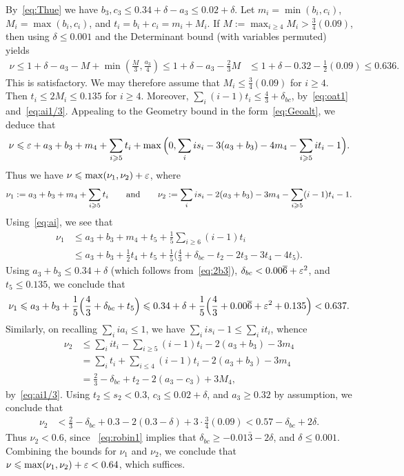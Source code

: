 By~\eqref{eq:Thue} we have $b_3,c_3\le 0.34+\delta-a_3\le 0.02+\delta$.
Let $m_i=\min(b_i,c_i)$, $M_i=\max(b_i,c_i)$, and $t_i=b_i+c_i=m_i+M_i$.
 If $M :=\max_{i\ge4}M_i > \frac{3}{4}(0.09)$, then using $\delta\leq 0.001$ and the Determinant bound (with variables permuted) yields
\begin{align*}
\nu \le 1 +\delta- a_3 - M + \min\left(\frac{M}{3}, \frac{a_3}{4}\right)
\le 1+\delta - a_3 - \frac{2}{3}M
&\le 1+\delta-0.32 - \frac{1}{2}(0.09) \le 0.636.
\end{align*}
This is satisfactory.
We may therefore assume that $M_i\le \frac{3}{4}(0.09)$ for $i\ge4$. Then $t_i\le 2M_i\le 0.135$ for $i\ge4$.
Moreover, $\sum_{i}(i-1)t_i \le \frac{4}{3}+\delta_{bc}$, by~\eqref{eq:oat1}
 and~\eqref{eq:ai1/3}.
Appealing to the Geometry bound in the form~\eqref{eq:Geoalt}, we deduce that
\begin{align*}
\nu \le \eps + a_3+b_3 + m_4+\sum_{i\ge5}t_i + \max\Big(0 , \sum_i is_i - 3(a_3+b_3) - 4m_4-\sum_{i\ge5}it_i - 1\Big).
\end{align*}
Thus we have $\nu \le \max(\nu_1,\nu_2)+\eps$, where
\begin{align*}
\nu_1 := a_3+b_3 + m_4+\sum_{i\ge5}t_i
\qquad{\rm and}\qquad
\nu_2
:= \sum_i is_i -2(a_3+b_3) - 3m_4 - \sum_{i\ge5}(i-1)t_i -1.
\end{align*}
Using~\eqref{eq:ai}, we see that
\begin{align*}
\nu_1 &\le a_3+b_3 +m_4+t_5+\frac{1}{5}\sum_{i\ge6}(i-1)t_i\\
 & \le a_3 + b_3 + \frac{1}{2}t_4+t_5+\frac{1}{5}\Big(\frac{4}{3}+\delta_{bc}-t_2-2t_3- 3t_4-4t_5\Big).
\end{align*}
Using $a_3+b_3\le 0.34+\delta$ (which follows from~\eqref{eq:2b3}), $\delta_{bc}<0.00\overline{6}+\eps^2$, and $t_5\le 0.135$, we conclude that
\[
\nu_1 \le a_3+b_3 + \frac{1}{5}\Big(\frac{4}{3}+\delta_{bc}+t_5\Big)
 \le 0.34+ \delta + \frac{1}{5}\Big(\frac{4}{3}+0.00\overline{6}+\eps^2+0.135\Big) < 0.637.
\]
Similarly, on recalling $\sum_i i a_i \le 1$, we have $\sum_i is_i -1 \le \sum_i it_i$, whence
\begin{align*}
\nu_2
&\le \sum_i it_i - \sum_{i\ge5}(i-1)t_i -2(a_3+b_3) - 3m_4\\
&= \sum_{i} t_i + \sum_{i\le4}(i-1)t_i -2(a_3+b_3) - 3m_4\\
& = \frac{2}{3} -\delta_{bc}+ t_2 - 2(a_3-c_3) +3M_4,
\end{align*}
by~\eqref{eq:ai1/3}. Using
$t_2\le s_2< 0.3$, $c_3\le 0.02+\delta$, and $a_3\ge 0.32$ by assumption, we conclude that
\begin{align*}
\nu_2
& < \frac{2}{3} -\delta_{bc} + 0.3 - 2(0.3-\delta) + 3\cdot\frac{3}{4}(0.09) <
0.57-\delta_{bc}+2\delta.
\end{align*}
Thus $\nu_2<0.6$, since
~\eqref{eq:robin1} implies that $\delta_{bc}\geq -0.01\bar3-2\delta$, and $\delta\leq 0.001$. Combining the bounds for $\nu_1$ and $\nu_2$, we conclude that $\nu \le \max(\nu_1,\nu_2)+\eps<0.64$, which suffices.


